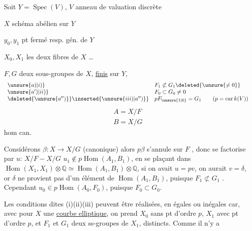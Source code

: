 Soit $Y=\operatorname{Spec}(V)$, $V$ anneau de valuation discrète

$X$ schéma abélien sur $Y$

$y_0,y_1$ pt fermé resp. gén. de $Y$

$X_0,X_1$ les deux fibres de $X$ \ldots

$F,G$ deux sous-groupes de $X$, \uline{finis} sur $Y$,
\[
\begin{array}{ll}
\unsure{a)|i)}&F_1\not\subset G_1\deleted{\unsure{\ne 0}}\\
\unsure{a')|ii)}&F_0\subset G_0\ne 0\\
\deleted{\unsure{a'')}}\inserted{\unsure{iii)|a'')}}&pF_{\unsure{1|0}}=G_1\qquad(p=\operatorname{car}k(V))
\end{array}
\]
\[
\begin{array}{l}A=X/F\\B=X/G\end{array}
\]
hom can.

Considérons $\beta:X\longrightarrow X/G$ (canonique) alors $p\beta$ s'annule sur  $F$ , donc se factorise par \uline{$u$}: $X/F-X/G$
 $u_1\notin p\operatorname{Hom}(A_1,B_1)$, en  se plaçant dans $\operatorname{Hom}(X_1,X_1)\otimes\mathbb Q\simeq\operatorname{Hom}(A_1,B_1)\otimes\mathbb Q$, si on avait $u=pv$, on aurait $v=\delta$, or $\delta$ ne provient pas d'un élément de $\operatorname{Hom}(A_1,B_1)$, puisque $F_1\not\subset G_1$ \deleted{[\unsure{sinon}, par (i), on aurait $F_1=0$ d'où $F_0=0$ qui contredit (ii)]}. Cependant $u_0\in p\operatorname{Hom}(A_0,F_0)$, puisque $F_0\subset G_0$.

Les conditions dites (i)(ii)(iii) peuvent être réalisées, en égales ou inégales car, avec pour $X$ une \uline{courbe elliptique}, on prend $X_0$ sans pt d'ordre $p$, $X_1$ avec pt d'ordre $p$, et $F_1$ et $G_1$ deux ss-groupes de $X_1$,  distincts. Comme il n'y a
